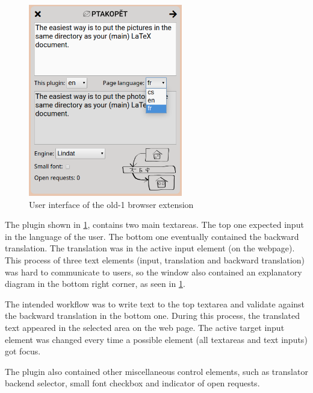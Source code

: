 \begin{figure}[ht]
    \centering
    \includegraphics[width=0.6\textwidth]{img/ptakopet_old-1/lang_select}
    \caption{User interface of the \ptakopet{} old-1 browser extension}
    \label{fig:ptakopet_old-1/lang_select}
\end{figure}

The plugin shown in \cref{fig:ptakopet_old-1/lang_select}, contains two main textareas. The top one expected input in the language of the user. The bottom one eventually contained the backward translation. The translation was in the active input element (on the webpage). This process of three text elements (input, translation and backward translation) was hard to communicate to users, so the window also contained an explanatory diagram in the bottom right corner, as seen in \cref{fig:ptakopet_old-1/lang_select}.

The intended workflow was to write text to the top textarea and validate against the backward translation in the bottom one. During this process, the translated text appeared in the selected area on the web page. The active target input element was changed every time a possible element (all textareas and text inputs) got focus.

The plugin also contained other miscellaneous control elements, such as translator backend selector, small font checkbox and indicator of open requests. 

